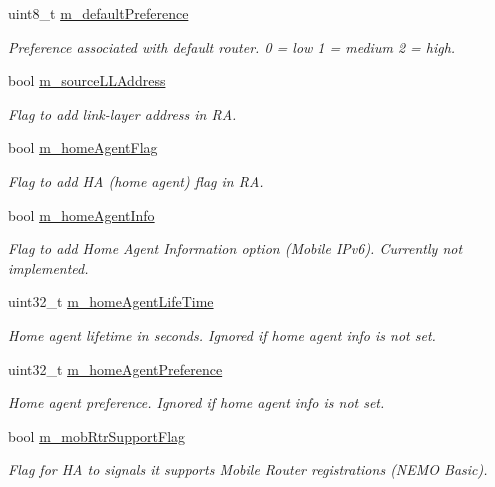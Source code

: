 \begin{DoxyCompactItemize}
uint8\+\_\+t \hyperlink{classns3_1_1RadvdInterface_a5e5b744252884bfda1b660fbe84acd6a}{m\+\_\+default\+Preference}
\begin{DoxyCompactList}\small\item\em Preference associated with default router. 0 = low 1 = medium 2 = high. \end{DoxyCompactList}\item 
bool \hyperlink{classns3_1_1RadvdInterface_a56f94e906d5f7164011d25642f276366}{m\+\_\+source\+L\+L\+Address}
\begin{DoxyCompactList}\small\item\em Flag to add link-\/layer address in RA. \end{DoxyCompactList}\item 
bool \hyperlink{classns3_1_1RadvdInterface_abd286a6408ad7936f6241eabd13379be}{m\+\_\+home\+Agent\+Flag}
\begin{DoxyCompactList}\small\item\em Flag to add HA (home agent) flag in RA. \end{DoxyCompactList}\item 
bool \hyperlink{classns3_1_1RadvdInterface_a668b3f28b13c42885108599b58140c49}{m\+\_\+home\+Agent\+Info}
\begin{DoxyCompactList}\small\item\em Flag to add Home Agent Information option (Mobile I\+Pv6). Currently not implemented. \end{DoxyCompactList}\item 
uint32\+\_\+t \hyperlink{classns3_1_1RadvdInterface_a69618e1b52b6af3140d9fd8fe98fdd6e}{m\+\_\+home\+Agent\+Life\+Time}
\begin{DoxyCompactList}\small\item\em Home agent lifetime in seconds. Ignored if home agent info is not set. \end{DoxyCompactList}\item 
uint32\+\_\+t \hyperlink{classns3_1_1RadvdInterface_ae2318bfaab9b5540ed402716a157ceec}{m\+\_\+home\+Agent\+Preference}
\begin{DoxyCompactList}\small\item\em Home agent preference. Ignored if home agent info is not set. \end{DoxyCompactList}\item 
bool \hyperlink{classns3_1_1RadvdInterface_ad3bbc067bb5b7f5618014bb498c6e0ea}{m\+\_\+mob\+Rtr\+Support\+Flag}
\begin{DoxyCompactList}\small\item\em Flag for HA to signals it supports Mobile Router registrations (N\+E\+MO Basic). \end{DoxyCompactList}\item 

\end{DoxyCompactItemize}
